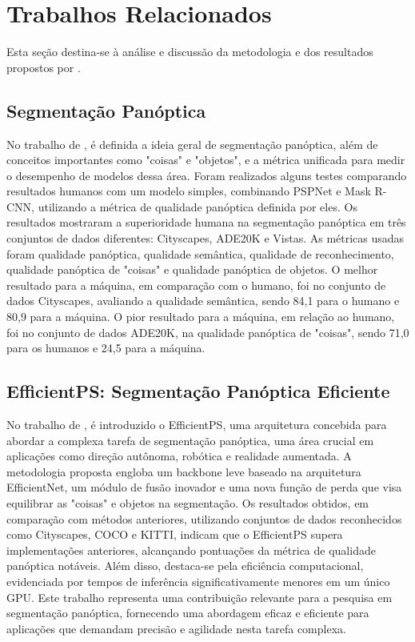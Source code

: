 \section{Trabalhos Relacionados}

Esta seção destina-se à análise e discussão da metodologia e dos resultados propostos por .

\subsection*{Segmentação Panóptica}

No trabalho de , é definida a ideia geral de segmentação panóptica, além de conceitos importantes como "coisas" e "objetos", e a métrica unificada para medir o desempenho de modelos dessa área. Foram realizados alguns testes comparando resultados humanos com um modelo simples, combinando PSPNet e Mask R-CNN, utilizando a métrica de qualidade panóptica definida por eles. Os resultados mostraram a superioridade humana na segmentação panóptica em três conjuntos de dados diferentes: Cityscapes, ADE20K e Vistas. As métricas usadas foram qualidade panóptica, qualidade semântica, qualidade de reconhecimento, qualidade panóptica de "coisas" e qualidade panóptica de objetos. O melhor resultado para a máquina, em comparação com o humano, foi no conjunto de dados Cityscapes, avaliando a qualidade semântica, sendo 84,1 para o humano e 80,9 para a máquina. O pior resultado para a máquina, em relação ao humano, foi no conjunto de dados ADE20K, na qualidade panóptica de "coisas", sendo 71,0 para os humanos e 24,5 para a máquina.

\subsection*{EfficientPS: Segmentação Panóptica Eficiente}

No trabalho de , é introduzido o EfficientPS, uma arquitetura concebida para abordar a complexa tarefa de segmentação panóptica, uma área crucial em aplicações como direção autônoma, robótica e realidade aumentada. A metodologia proposta engloba um backbone leve baseado na arquitetura EfficientNet, um módulo de fusão inovador e uma nova função de perda que visa equilibrar as "coisas" e objetos na segmentação. Os resultados obtidos, em comparação com métodos anteriores, utilizando conjuntos de dados reconhecidos como Cityscapes, COCO e KITTI, indicam que o EfficientPS supera implementações anteriores, alcançando pontuações da métrica de qualidade panóptica notáveis. Além disso, destaca-se pela eficiência computacional, evidenciada por tempos de inferência significativamente menores em um único GPU. Este trabalho representa uma contribuição relevante para a pesquisa em segmentação panóptica, fornecendo uma abordagem eficaz e eficiente para aplicações que demandam precisão e agilidade nesta tarefa complexa.

